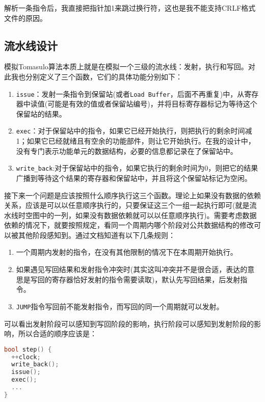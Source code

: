\documentclass[12pt, UTF8]{article}
\begin{document}
解析一条指令后，我直接把指针加1来跳过换行符，这也是我不能支持CRLF格式文件的原因。

\subsection{流水线设计}

模拟Tomasulo算法本质上就是在模拟一个三级的流水线：发射，执行和写回。对此我也分别定义了三个函数，它们的具体功能分别如下：

\begin{enumerate}
  \item \lstinline|issue|：发射一条指令到保留站(或者\lstinline|Load Buffer|，后面不再重复)中，从寄存器中读值(可能是有效的值或者保留站编号)，并将目标寄存器标记为等待这个保留站的结果。
  \item \lstinline|exec|：对于保留站中的指令，如果它已经开始执行，则把执行的剩余时间减1；如果它已经就绪且有空余的功能部件，则让它开始执行。在我的设计中，没有专门表示功能单元的数据结构，必要的信息都记录在了保留站中。
  \item \lstinline|write_back|:对于保留站中的指令，如果它执行的剩余时间为0，则把它的结果广播到等待这个结果的寄存器和保留站中，并且将这个保留站标记为空闲。
\end{enumerate}

接下来一个问题是应该按照什么顺序执行这三个函数。理论上如果没有数据的依赖关系，应该是可以以任意顺序执行的，只要保证这三个一组一起执行即可(就是流水线时空图中的一列，如果没有数据依赖就可以以任意顺序执行)。需要考虑数据依赖的情况下，就要按照规定，看同一个周期内哪个阶段对公共数据结构的修改可以被其他阶段感知到。通过文档知道有以下几条规则：

\begin{enumerate}
  \item 一个周期内发射的指令，在没有其他限制的情况下在本周期开始执行。
  \item 如果遇见写回结果和发射指令冲突时(其实这叫冲突并不是很合适，表达的意思是写回的寄存器恰好发射的指令需要读取)，默认先写回结果，后发射指令。
  \item \lstinline|JUMP|指令写回前不能发射指令，而写回的同一个周期就可以发射。
\end{enumerate}

可以看出发射阶段可以感知到写回阶段的影响，执行阶段可以感知到发射阶段的影响，所以合适的顺序应该是：

\begin{lstlisting}[language = C++]
bool step() {
  ++clock;
  write_back();
  issue();
  exec();
  ...
}
\end{lstlisting}
\end{document}
